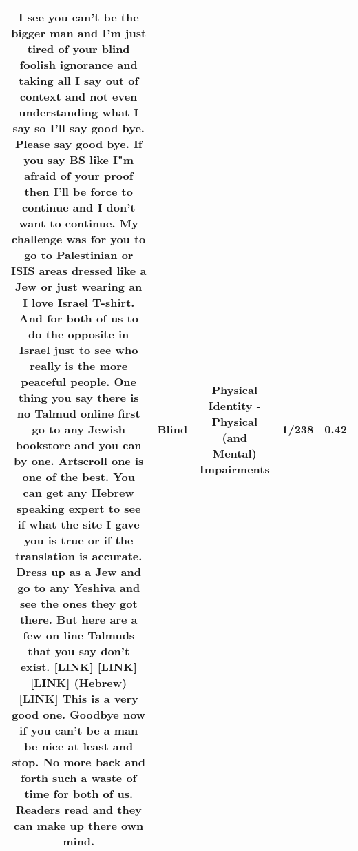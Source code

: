 \documentclass[11pt]{article}
\newlength\mylength
\begin{document}
\begin{center}
\begin{longtable}{|C{.65\mylength}|C{.30\mylength}|C{.12\mylength}|C{.12\mylength}|C{.12\mylength}|}
  \small I see you can't be the bigger man and I'm just tired of your \textbf{blind} foolish ignorance and taking all I say out of context and not even understanding what I say so I'll say good bye. Please say good bye. If you say BS like I"m afraid of your proof then I'll be force to continue and I don't want to continue. My challenge was for you to go to Palestinian or ISIS areas dressed like a Jew or just wearing an I love Israel T-shirt. And for both of us to do the opposite in Israel just to see who really is the more peaceful people. One thing you say there is no Talmud online first go to any Jewish bookstore and you can by one. Artscroll one is one of the best. You can get any Hebrew speaking expert to see if what the site I gave you is true or if the translation is accurate.  Dress up as a Jew and go to any Yeshiva and see the ones they got there. But here are a few on line Talmuds that you say don't exist.  [LINK]  [LINK]  [LINK]  (Hebrew) [LINK]    This is a very good one. Goodbye now if you can't be a man be nice at least and stop. No more back and forth such a waste of time for both of us. Readers read and they can make up there own mind.\normalsize   & Blind & Physical Identity - Physical (and Mental) Impairments & 1/238 & 0.42 \\  \hline

\end{longtable}
\end{center}
\end{document}
